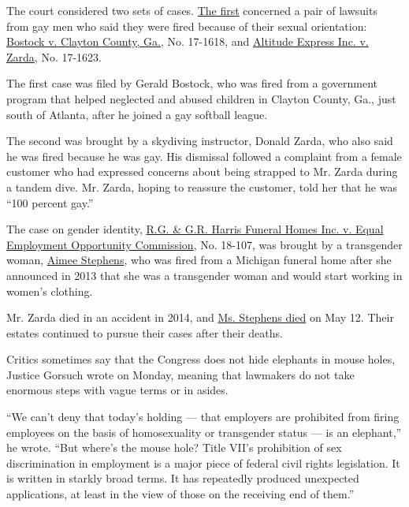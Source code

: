 The court considered two sets of cases.
\href{https://www.supremecourt.gov/oral_arguments/argument_transcripts/2019/17-1618_7k47.pdf}{The
first} concerned a pair of lawsuits from gay men who said they were
fired because of their sexual orientation:
\href{http://www.scotusblog.com/case-files/cases/bostock-v-clayton-county-georgia/}{Bostock
v. Clayton County, Ga.}, No. 17-1618, and
\href{http://www.scotusblog.com/case-files/cases/altitude-express-inc-v-zarda/}{Altitude
Express Inc. v. Zarda}, No. 17-1623.

The first case was filed by Gerald Bostock, who was fired from a
government program that helped neglected and abused children in Clayton
County, Ga., just south of Atlanta, after he joined a gay softball
league.

The second was brought by a skydiving instructor, Donald Zarda, who also
said he was fired because he was gay. His dismissal followed a complaint
from a female customer who had expressed concerns about being strapped
to Mr. Zarda during a tandem dive. Mr. Zarda, hoping to reassure the
customer, told her that he was ``100 percent gay.''

The case on gender identity,
\href{http://www.scotusblog.com/case-files/cases/r-g-g-r-harris-funeral-homes-inc-v-equal-opportunity-employment-commission/}{R.G.
\& G.R. Harris Funeral Homes Inc. v. Equal Employment Opportunity
Commission}, No. 18-107, was brought by a transgender woman,
\href{https://www.nytimes.com/2020/05/12/us/aimee-stephens-supreme-court-dead.html}{Aimee
Stephens}, who was fired from a Michigan funeral home after she
announced in 2013 that she was a transgender woman and would start
working in women's clothing.

Mr. Zarda died in an accident in 2014, and
\href{https://www.nytimes.com/2020/05/12/us/aimee-stephens-supreme-court-dead.html}{Ms.
Stephens died} on May 12. Their estates continued to pursue their cases
after their deaths.

Critics sometimes say that the Congress does not hide elephants in mouse
holes, Justice Gorsuch wrote on Monday, meaning that lawmakers do not
take enormous steps with vague terms or in asides.

``We can't deny that today's holding --- that employers are prohibited
from firing employees on the basis of homosexuality or transgender
status --- is an elephant,'' he wrote. ``But where's the mouse hole?
Title VII's prohibition of sex discrimination in employment is a major
piece of federal civil rights legislation. It is written in starkly
broad terms. It has repeatedly produced unexpected applications, at
least in the view of those on the receiving end of them.''

